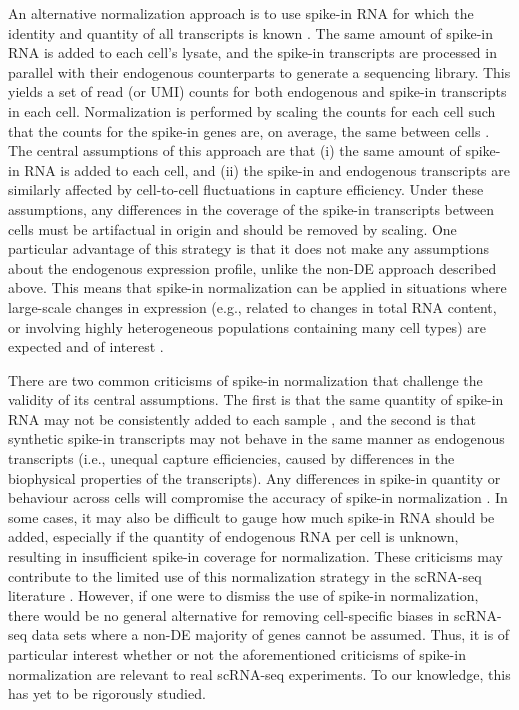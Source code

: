 \documentclass{article}
\begin{document}
An alternative normalization approach is to use spike-in RNA for which the identity and quantity of all transcripts is known \citep{stegle2015computational,bacher2016design}.
The same amount of spike-in RNA is added to each cell's lysate, and the spike-in transcripts are processed in parallel with their endogenous counterparts to generate a sequencing library.
This yields a set of read (or UMI) counts for both endogenous and spike-in transcripts in each cell.
Normalization is performed by scaling the counts for each cell such that the counts for the spike-in genes are, on average, the same between cells \citep{katayama2013samstrt}.
The central assumptions of this approach are that (i) the same amount of spike-in RNA is added to each cell, and (ii) the spike-in and endogenous transcripts are similarly affected by cell-to-cell fluctuations in capture efficiency.
Under these assumptions, any differences in the coverage of the spike-in transcripts between cells must be artifactual in origin and should be removed by scaling.
One particular advantage of this strategy is that it does not make any assumptions about the endogenous expression profile, unlike the non-DE approach described above.
This means that spike-in normalization can be applied in situations where large-scale changes in expression (e.g., related to changes in total RNA content, or involving highly heterogeneous populations containing many cell types) are expected and of interest \citep{lun2016stepbystep,nestorowa2016single}.

There are two common criticisms of spike-in normalization that challenge the validity of its central assumptions.
The first is that the same quantity of spike-in RNA may not be consistently added to each sample \citep{robinson2010tmm}, and the second is that synthetic spike-in transcripts may not behave in the same manner as endogenous transcripts \citep{grun2015design} (i.e., unequal capture efficiencies, caused by differences in the biophysical properties of the transcripts).
Any differences in spike-in quantity or behaviour across cells will compromise the accuracy of spike-in normalization \citep{risso2014normalization}.
In some cases, it may also be difficult to gauge how much spike-in RNA should be added, especially if the quantity of endogenous RNA per cell is unknown, resulting in insufficient spike-in coverage for normalization.
These criticisms may contribute to the limited use of this normalization strategy in the scRNA-seq literature \citep{bacher2016design}.
However, if one were to dismiss the use of spike-in normalization, there would be no general alternative for removing cell-specific biases in scRNA-seq data sets where a non-DE majority of genes cannot be assumed.
Thus, it is of particular interest whether or not the aforementioned criticisms of spike-in normalization are relevant to real scRNA-seq experiments.
To our knowledge, this has yet to be rigorously studied.
\end{document}
